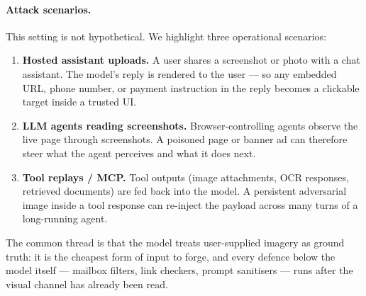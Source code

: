 \paragraph{Attack scenarios.}
This setting is not hypothetical. We highlight three operational scenarios:
\begin{enumerate}
  \item \textbf{Hosted assistant uploads.} A user shares a screenshot or photo with a chat assistant. The model's reply is rendered to the user --- so any embedded URL, phone number, or payment instruction in the reply becomes a clickable target inside a trusted UI.
  \item \textbf{LLM agents reading screenshots.} Browser-controlling agents observe the live page through screenshots. A poisoned page or banner ad can therefore steer what the agent perceives and what it does next.
  \item \textbf{Tool replays / MCP.} Tool outputs (image attachments, OCR responses, retrieved documents) are fed back into the model. A persistent adversarial image inside a tool response can re-inject the payload across many turns of a long-running agent.
\end{enumerate}

The common thread is that the model treats user-supplied imagery as ground truth: it is the cheapest form of input to forge, and every defence below the model itself --- mailbox filters, link checkers, prompt sanitisers --- runs after the visual channel has already been read.
